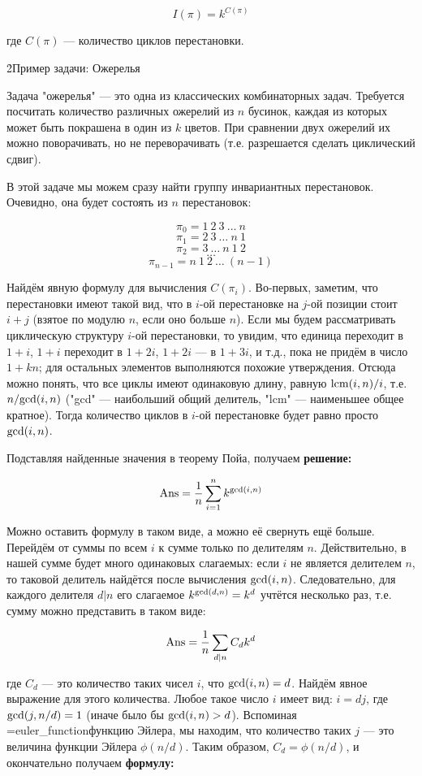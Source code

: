 $$ I(\pi) = k ^ {C(\pi)} $$

где $C(\pi)$ --- количество циклов перестановки.

\h2{Пример задачи: Ожерелья}

Задача "ожерелья" --- это одна из классических комбинаторных задач. Требуется посчитать количество различных ожерелий из $n$ бусинок, каждая из которых может быть покрашена в один из $k$ цветов. При сравнении двух ожерелий их можно поворачивать, но не переворачивать (т.е. разрешается сделать циклический сдвиг).

В этой задаче мы можем сразу найти группу инвариантных перестановок. Очевидно, она будет состоять из $n$ перестановок:

$$ \pi_0 = 1\ 2\ 3\ \ldots\ n $$
$$ \pi_1 = 2\ 3\ \ldots\ n\ 1 $$
$$ \pi_2 = 3\ \ldots\ n\ 1\ 2 $$
$$ \ldots $$
$$ \pi_{n-1} = n\ 1\ 2\ \ldots\ (n-1) $$

Найдём явную формулу для вычисления $C(\pi_i)$. Во-первых, заметим, что перестановки имеют такой вид, что в $i$-ой перестановке на $j$-ой позиции стоит $i+j$ (взятое по модулю $n$, если оно больше $n$). Если мы будем рассматривать циклическую структуру $i$-ой перестановки, то увидим, что единица переходит в $1+i$, $1+i$ переходит в $1+2i$, $1+2i$ --- в $1+3i$, и т.д., пока не придём в число $1 + kn$; для остальных элементов выполняются похожие утверждения. Отсюда можно понять, что все циклы имеют одинаковую длину, равную ${\rm lcm}(i,n) / i$, т.е. $n / {\rm gcd}(i,n)$ ("gcd" --- наибольший общий делитель, "lcm" --- наименьшее общее кратное). Тогда количество циклов в $i$-ой перестановке будет равно просто ${\rm gcd}(i,n)$.

Подставляя найденные значения в теорему Пойа, получаем \bf{решение}:

$$ {\rm Ans} = \frac{1}{n} \sum_{i=1}^{n} k ^ {{\rm gcd}(i,n)} $$

Можно оставить формулу в таком виде, а можно её свернуть ещё больше. Перейдём от суммы по всем $i$ к сумме только по делителям $n$. Действительно, в нашей сумме будет много одинаковых слагаемых: если $i$ не является делителем $n$, то таковой делитель найдётся после вычисления ${\rm gcd}(i,n)$. Следовательно, для каждого делителя $d|n$ его слагаемое $k^{{\rm gcd}(d,n)} = k^d$ учтётся несколько раз, т.е. сумму можно представить в таком виде:

$$ {\rm Ans} = \frac{1}{n} \sum_{d|n} C_d k^d $$

где $C_d$ --- это количество таких чисел $i$, что ${\rm gcd}(i,n) = d$. Найдём явное выражение для этого количества. Любое такое число $i$ имеет вид: $i=dj$, где ${\rm gcd}(j,n/d) = 1$ (иначе было бы ${\rm gcd}(i,n) > d$). Вспоминая \algohref=euler_function{функцию Эйлера}, мы находим, что количество таких $j$ --- это величина функции Эйлера $\phi(n/d)$. Таким образом, $C_d = \phi(n/d)$, и окончательно получаем \bf{формулу}:

